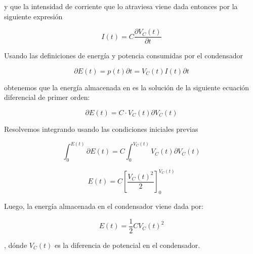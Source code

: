 \documentclass[../main.tex]{subfiles}
\begin{document}
y que la intensidad de corriente que lo atraviesa viene dada entonces por la siguiente expresión

$$I(t) = C \frac{\partial V_C(t)}{\partial t}$$

Usando las definiciones de energía y potencia consumidas por el condensador

$$\partial E(t) = p(t)  \partial t = V_C(t) I(t) \partial t $$

obtenemos que la energía almacenada en es la solución de la siguiente ecuación diferencial de primer orden:

$$\partial E(t) = C \cdot V_C(t) \partial V_C(t)$$

Resolvemos integrando usando las condiciones iniciales previas

$$\int_{0}^{E(t)} \partial E(t) = C \int_{0}^{V_C(t)} V_C(t) \partial V_C(t) $$

$$E(t) = C \left[ \frac{V_C(t)^2}{2} \right]_{0}^{V_C(t)}$$

Luego, la energía almacenada en el condensador viene dada por:

\begin{equation}
    E(t) = \frac{1}{2}CV_C(t)^2
\end{equation}

, dónde $V_C(t)$ es la diferencia de potencial en el condensador.
\end{document}
